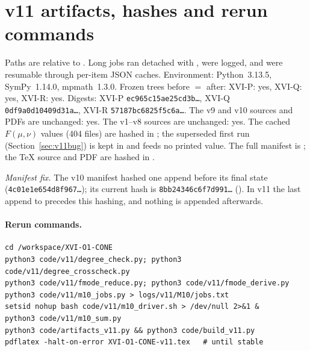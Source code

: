 
\section{v11 artifacts, hashes and rerun commands}
\label{app:v11artifacts}

Paths are relative to . Long jobs ran
detached with , were logged, and were resumable through
per-item JSON caches. Environment: Python~3.13.5, SymPy~1.14.0, mpmath~1.3.0.
Frozen trees before \(=\) after: XVI-P: yes, XVI-Q: yes, XVI-R: yes.
Digests: XVI-P \texttt{ec965c15ae25cd3b\ldots}, XVI-Q \texttt{0df9a0d10409d31a\ldots}, XVI-R \texttt{57187bc6825f5c6a\ldots}.
The v9 and v10 sources and PDFs are unchanged: yes. The v1--v8 sources are unchanged: yes.
The cached \(F(\mu,\nu)\) values (404 files) are hashed in ; the
superseded first run (Section~\ref{sec:v11bug}) is kept in  and feeds no printed value.
The full manifest is ; the \TeX{} source and PDF are hashed in .

\emph{Manifest fix.} The v10 manifest hashed  one append before its final state
(\texttt{4c01e1e654d8f967\ldots}); its current hash is
\texttt{8bb24346c6f7d991\ldots} (). In v11 the last
append to  precedes this hashing, and nothing is appended afterwards.

\paragraph{Rerun commands.}
\begin{verbatim}
cd /workspace/XVI-O1-CONE
python3 code/v11/degree_check.py; python3 code/v11/degree_crosscheck.py
python3 code/v11/fmode_reduce.py; python3 code/v11/fmode_derive.py
python3 code/v11/m10_jobs.py > logs/v11/M10/jobs.txt
setsid nohup bash code/v11/m10_driver.sh > /dev/null 2>&1 &
python3 code/v11/m10_sum.py
python3 code/artifacts_v11.py && python3 code/build_v11.py
pdflatex -halt-on-error XVI-O1-CONE-v11.tex   # until stable
\end{verbatim}

